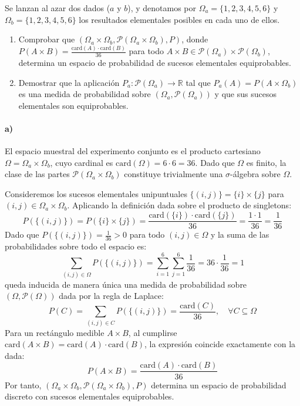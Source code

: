 \begin{problema}
Se lanzan al azar dos dados ($a$ y $b$), y denotamos por $\Omega_a = \{1,2,3,4,5,6\}$ y $\Omega_b = \{1,2,3,4,5,6\}$ los resultados elementales posibles en cada uno de ellos.
\begin{enumerate}[label=\alph*)]
    \item Comprobar que $(\Omega_a \times \Omega_b, \mathcal{P}(\Omega_a \times \Omega_b), P)$, donde $P(A \times B) = \frac{\text{card}(A) \cdot \text{card}(B)}{36}$ para todo $A \times B \in \mathcal{P}(\Omega_a) \times \mathcal{P}(\Omega_b)$, determina un espacio de probabilidad de sucesos elementales equiprobables.
    \item Demostrar que la aplicación $P_a : \mathcal{P}(\Omega_a) \to \mathbb{R}$ tal que $P_a(A) = P(A \times \Omega_b)$ es una medida de probabilidad sobre $(\Omega_a, \mathcal{P}(\Omega_a))$ y que sus sucesos elementales son equiprobables.
\end{enumerate}

\tcblower

\paragraph{a)}
El espacio muestral del experimento conjunto es el producto cartesiano $\Omega = \Omega_a \times \Omega_b$, cuyo cardinal es $\text{card}(\Omega) = 6 \cdot 6 = 36$. Dado que $\Omega$ es finito, la clase de las partes $\mathcal{P}(\Omega_a \times \Omega_b)$ constituye trivialmente una $\sigma$-álgebra sobre $\Omega$.

Consideremos los sucesos elementales unipuntuales $\{(i,j)\} = \{i\} \times \{j\}$ para $(i,j) \in \Omega_a \times \Omega_b$. Aplicando la definición dada sobre el producto de singletons:
\[
    P(\{(i,j)\}) = P(\{i\} \times \{j\}) = \frac{\text{card}(\{i\}) \cdot \text{card}(\{j\})}{36} = \frac{1 \cdot 1}{36} = \frac{1}{36}
\]
Dado que $P(\{(i,j)\}) = \frac{1}{36} > 0$ para todo $(i,j) \in \Omega$ y la suma de las probabilidades sobre todo el espacio es:
\[
    \sum_{(i,j) \in \Omega} P(\{(i,j)\}) = \sum_{i=1}^6 \sum_{j=1}^6 \frac{1}{36} = 36 \cdot \frac{1}{36} = 1
\]
queda inducida de manera única una medida de probabilidad sobre $(\Omega, \mathcal{P}(\Omega))$ dada por la regla de Laplace:
\[
    P(C) = \sum_{(i,j) \in C} P(\{(i,j)\}) = \frac{\text{card}(C)}{36}, \quad \forall C \subseteq \Omega
\]
Para un rectángulo medible $A \times B$, al cumplirse $\text{card}(A \times B) = \text{card}(A) \cdot \text{card}(B)$, la expresión coincide exactamente con la dada:
\[
    P(A \times B) = \frac{\text{card}(A) \cdot \text{card}(B)}{36}
\]
Por tanto, $(\Omega_a \times \Omega_b, \mathcal{P}(\Omega_a \times \Omega_b), P)$ determina un espacio de probabilidad discreto con sucesos elementales equiprobables.


\end{problema}
